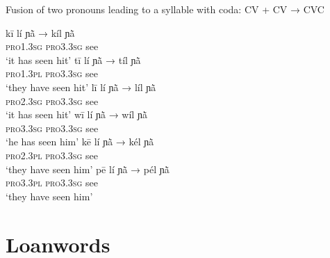 \documentclass[output=paper]{langscibook}
\begin{document}
    \begin{exe}
        \ex Fusion of two pronouns leading to a syllable with coda:   CV + CV → CVC \label{ex:traore:40}
        \begin{xlist}
            \ex \gll kī              lí                  ɲã̀                →        kíl ɲã̀ \label{ex:traore:40a}\\ 
             \textsc{pro1.3sg}     \textsc{pro3.3sg}      see             {}          {}\\
             \glt `it has seen hit'
            \ex \gll tī               lí                  ɲã̀               →        tíl ɲã̀ \label{ex:traore:40b}\\ 
            \textsc{pro1.3pl}     \textsc{pro3.3sg}      see                 {}         {}\\
            \glt `they have seen hit'
            \ex \gll  lī                lí                  ɲã̀                →        líl  ɲã̀ \label{ex:traore:40c} \\
                \textsc{pro2.3sg}     \textsc{pro3.3sg}      see                {}  {}\\
                \glt `it has seen hit'
            \ex \gll wī              lí                  ɲã̀                →        wíl ɲã̀ \label{ex:traore:40d}\\
                \textsc{pro3.3sg}     \textsc{pro3.3sg}      see             {}         {}\\
                \glt `he has seen him'
            \ex \gll kē              lí                  ɲã̀                →        kél ɲã̀ \label{ex:traore:40e}\\
                \textsc{pro2.3pl}       \textsc{pro3.3sg}    see        {}      {}\\
                \glt `they have seen him'
            \ex \gll pē              lí                  ɲã̀                →        pél ɲã̀ \label{ex:traore:40f}\\
                \textsc{pro3.3pl}     \textsc{pro3.3sg}      see         {}     {}\\
                \glt `they have seen him'
        \end{xlist}
    \end{exe}

\section{Loanwords}
\label{sec:traore:loanwords:5}
\end{document}
